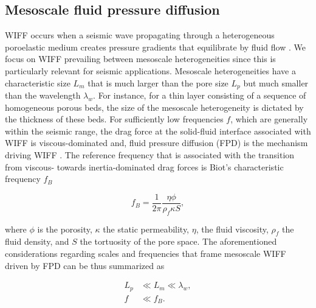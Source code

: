 \documentclass[draft]{agujournal2019}
\begin{document}
\subsection{Mesoscale fluid pressure diffusion}
WIFF occurs when a seismic wave propagating through a heterogeneous poroelastic medium creates
pressure gradients that equilibrate by fluid flow \cite{Muller2010}.
We focus on WIFF prevailing between mesoscale heterogeneities since this is particularly relevant for seismic applications. Mesoscale heterogeneities have a characteristic size $L_m$ that is much larger than the pore size $L_p$ but much smaller than the wavelength $\lambda_w$. For instance, for a thin layer consisting of a sequence of homogeneous porous beds, the size of the mesoscale heterogeneity is dictated by the thickness of these beds.
For sufficiently low frequencies $f$, which are generally within the seismic range, the drag force at the solid-fluid interface associated with WIFF is viscous-dominated \cite{Johnson1987} and, fluid pressure diffusion (FPD) is the mechanism driving WIFF \cite{Pride2005}. The reference frequency that is associated with the transition from viscous- towards inertia-dominated drag forces is Biot's characteristic frequency $f_B$ \cite{Biot1956, Dutta1979}
\begin{linenomath*}
\begin{equation}\label{Eq.1}
f_B= \frac{1}{2 \pi} \frac{\eta \phi}{ \rho_f \kappa S },
\end{equation}
\end{linenomath*}
where $\phi$ is the porosity, $\kappa$  the static permeability, $\eta$, the fluid viscosity,  $\rho_f$ the fluid density, and $S$ the tortuosity of the pore space. The aforementioned considerations regarding scales and frequencies that frame mesoscale WIFF driven by FPD can be thus summarized as
\begin{linenomath*}
\begin{equation}\label{Eq.2}
\begin{split}
 L_p & \ll L_m \ll \lambda_w, \\
f & \ll f_B.
\end{split}
\end{equation}
\end{linenomath*}
\end{document}
